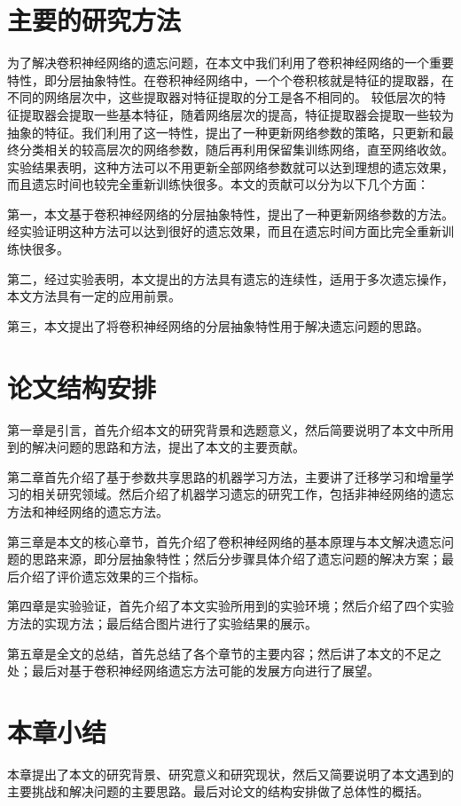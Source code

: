 \section{主要的研究方法}
为了解决卷积神经网络的遗忘问题，在本文中我们利用了卷积神经网络的一个重要特性，即分层抽象特性。在卷积神经网络中，一个个卷积核就是特征的提取器，在不同的网络层次中，这些提取器对特征提取的分工是各不相同的。
较低层次的特征提取器会提取一些基本特征，随着网络层次的提高，特征提取器会提取一些较为抽象的特征。我们利用了这一特性，提出了一种更新网络参数的策略，只更新和最终分类相关的较高层次的网络参数，随后再利用保留集训练网络，直至网络收敛。
实验结果表明，这种方法可以不用更新全部网络参数就可以达到理想的遗忘效果，而且遗忘时间也较完全重新训练快很多。本文的贡献可以分为以下几个方面：

第一，本文基于卷积神经网络的分层抽象特性，提出了一种更新网络参数的方法。经实验证明这种方法可以达到很好的遗忘效果，而且在遗忘时间方面比完全重新训练快很多。

第二，经过实验表明，本文提出的方法具有遗忘的连续性，适用于多次遗忘操作，本文方法具有一定的应用前景。

第三，本文提出了将卷积神经网络的分层抽象特性用于解决遗忘问题的思路。

\section{论文结构安排}
第一章是引言，首先介绍本文的研究背景和选题意义，然后简要说明了本文中所用到的解决问题的思路和方法，提出了本文的主要贡献。

第二章首先介绍了基于参数共享思路的机器学习方法，主要讲了迁移学习和增量学习的相关研究领域。然后介绍了机器学习遗忘的研究工作，包括非神经网络的遗忘方法和神经网络的遗忘方法。

第三章是本文的核心章节，首先介绍了卷积神经网络的基本原理与本文解决遗忘问题的思路来源，即分层抽象特性；然后分步骤具体介绍了遗忘问题的解决方案；最后介绍了评价遗忘效果的三个指标。

第四章是实验验证，首先介绍了本文实验所用到的实验环境；然后介绍了四个实验方法的实现方法；最后结合图片进行了实验结果的展示。

第五章是全文的总结，首先总结了各个章节的主要内容；然后讲了本文的不足之处；最后对基于卷积神经网络遗忘方法可能的发展方向进行了展望。

\section{本章小结}
本章提出了本文的研究背景、研究意义和研究现状，然后又简要说明了本文遇到的主要挑战和解决问题的主要思路。最后对论文的结构安排做了总体性的概括。
